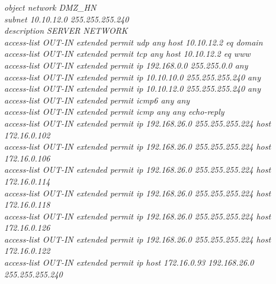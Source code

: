 \documentclass[12pt,a4paper]{report}
\begin{document}
\hspace*{1cm}\textit{object network DMZ\_HN\\
\hspace*{1cm}subnet 10.10.12.0 255.255.255.240\\
\hspace*{1cm}description SERVER NETWORK\\
\hspace*{1cm}access-list OUT-IN extended permit udp any host 10.10.12.2 eq domain \\
\hspace*{1cm}access-list OUT-IN extended permit tcp any host 10.10.12.2 eq www \\
\hspace*{1cm}access-list OUT-IN extended permit ip 192.168.0.0 255.255.0.0 any \\
\hspace*{1cm}access-list OUT-IN extended permit ip 10.10.10.0 255.255.255.240 any \\
\hspace*{1cm}access-list OUT-IN extended permit ip 10.10.12.0 255.255.255.240 any \\
\hspace*{1cm}access-list OUT-IN extended permit icmp6 any any\\
\hspace*{1cm}access-list OUT-IN extended permit icmp any any echo-reply\\
\hspace*{1cm}access-list OUT-IN extended permit ip 192.168.26.0 255.255.255.224 host 172.16.0.102\\
\hspace*{1cm}access-list OUT-IN extended permit ip 192.168.26.0 255.255.255.224 host 172.16.0.106\\
\hspace*{1cm}access-list OUT-IN extended permit ip 192.168.26.0 255.255.255.224 host 172.16.0.114\\
\hspace*{1cm}access-list OUT-IN extended permit ip 192.168.26.0 255.255.255.224 host 172.16.0.118\\
\hspace*{1cm}access-list OUT-IN extended permit ip 192.168.26.0 255.255.255.224 host 172.16.0.126\\
\hspace*{1cm}access-list OUT-IN extended permit ip 192.168.26.0 255.255.255.224 host 172.16.0.122\\
\hspace*{1cm}access-list OUT-IN extended permit ip host 172.16.0.93 192.168.26.0 255.255.255.240\\
}
\end{document}
